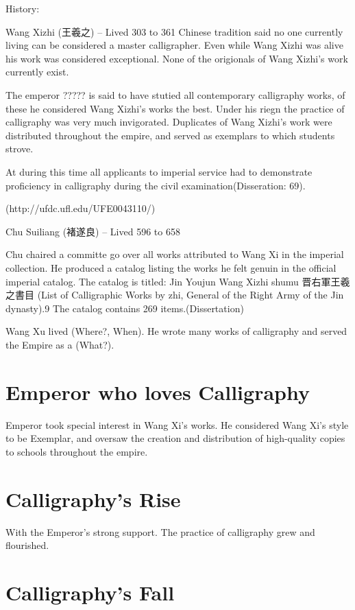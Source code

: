 History:

Wang Xizhi (王羲之) -- Lived 303 to 361
Chinese tradition said no one currently living can be considered a master calligrapher.  Even while Wang Xizhi was alive his work was considered exceptional.  None of the origionals of Wang Xizhi's work currently exist.

The emperor ????? is said to have stutied all contemporary calligraphy works, of these he considered Wang Xizhi's works the best.  Under his riegn the practice of calligraphy was very much invigorated.  Duplicates of Wang Xizhi's work were distributed throughout the empire, and served as exemplars to which students strove.

At during this time all applicants to imperial service had to demonstrate proficiency in calligraphy during the civil examination(Disseration: 69).

(http://ufdc.ufl.edu/UFE0043110/)

Chu Suiliang (褚遂良) -- Lived 596 to 658


Chu chaired a committe go over all works attributed to Wang Xi in the imperial collection.  He produced a catalog listing the works he felt genuin in the official imperial catalog.  The catalog is titled: 
Jin Youjun Wang Xizhi shumu 晋右軍王羲之書目 (List of Calligraphic Works by zhi, General of the Right Army of the Jin dynasty).9 The catalog contains 269 items.(Dissertation)


Wang Xu lived (Where?, When).  He wrote many works of calligraphy and served the Empire as a (What?).  

\section{Emperor who loves Calligraphy}

Emperor took special interest in Wang Xi's works.  He considered Wang Xi's style to be Exemplar, and oversaw the creation and distribution of high-quality copies to schools throughout the empire.

\section{Calligraphy's Rise}

With the Emperor's strong support. The practice of calligraphy grew and flourished.

\section{Calligraphy's Fall}

